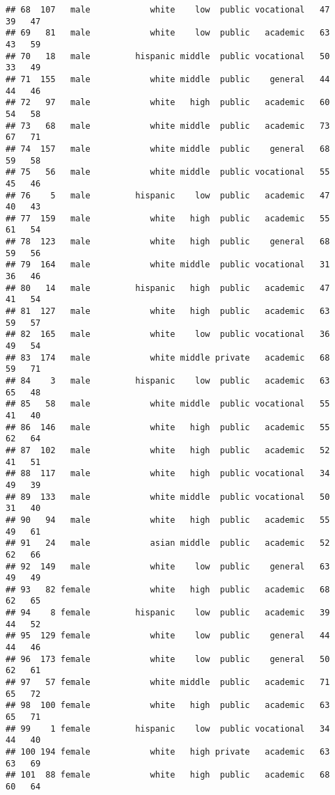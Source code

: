 \documentclass[
]{article}
\begin{document}
\begin{verbatim}
## 68  107   male            white    low  public vocational   47    39   47
## 69   81   male            white    low  public   academic   63    43   59
## 70   18   male         hispanic middle  public vocational   50    33   49
## 71  155   male            white middle  public    general   44    44   46
## 72   97   male            white   high  public   academic   60    54   58
## 73   68   male            white middle  public   academic   73    67   71
## 74  157   male            white middle  public    general   68    59   58
## 75   56   male            white middle  public vocational   55    45   46
## 76    5   male         hispanic    low  public   academic   47    40   43
## 77  159   male            white   high  public   academic   55    61   54
## 78  123   male            white   high  public    general   68    59   56
## 79  164   male            white middle  public vocational   31    36   46
## 80   14   male         hispanic   high  public   academic   47    41   54
## 81  127   male            white   high  public   academic   63    59   57
## 82  165   male            white    low  public vocational   36    49   54
## 83  174   male            white middle private   academic   68    59   71
## 84    3   male         hispanic    low  public   academic   63    65   48
## 85   58   male            white middle  public vocational   55    41   40
## 86  146   male            white   high  public   academic   55    62   64
## 87  102   male            white   high  public   academic   52    41   51
## 88  117   male            white   high  public vocational   34    49   39
## 89  133   male            white middle  public vocational   50    31   40
## 90   94   male            white   high  public   academic   55    49   61
## 91   24   male            asian middle  public   academic   52    62   66
## 92  149   male            white    low  public    general   63    49   49
## 93   82 female            white   high  public   academic   68    62   65
## 94    8 female         hispanic    low  public   academic   39    44   52
## 95  129 female            white    low  public    general   44    44   46
## 96  173 female            white    low  public    general   50    62   61
## 97   57 female            white middle  public   academic   71    65   72
## 98  100 female            white   high  public   academic   63    65   71
## 99    1 female         hispanic    low  public vocational   34    44   40
## 100 194 female            white   high private   academic   63    63   69
## 101  88 female            white   high  public   academic   68    60   64

\end{verbatim}
\end{document}

